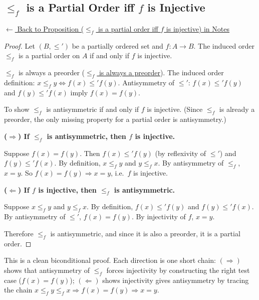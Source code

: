 
\subsection*{$\leq_f$ is a Partial Order iff $f$ is Injective}
\label{prf:induced-poset}

\begin{remark*}[Return]
\hyperref[prop:induced-poset]{$\leftarrow$ Back to Proposition ($\leq_f$ is a partial order iff $f$ is injective) in Notes}
\end{remark*}

\begin{proof}
\Claim Let $(B, \leq')$ be a partially ordered set and $f : A \to B$. The induced order $\leq_f$ is a partial order on $A$ if and only if $f$ is injective.

\Given $\leq_f$ is always a preorder
(\hyperref[prop:induced-preorder]{$\leq_f$ is always a preorder}). The
induced order definition: $x \leq_f y \Leftrightarrow f(x) \leq' f(y)$.
Antisymmetry of $\leq'$: $f(x) \leq' f(y)$ and $f(y) \leq' f(x)$ imply
$f(x) = f(y)$.

\Goal To show $\leq_f$ is antisymmetric if and only if $f$ is injective.
(Since $\leq_f$ is already a preorder, the only missing property for a partial
order is antisymmetry.)

\medskip
\noindent\textbf{($\Rightarrow$) If $\leq_f$ is antisymmetric, then $f$ is
injective.}

Suppose $f(x) = f(y)$. Then $f(x) \leq' f(y)$ (by reflexivity of $\leq'$)
and $f(y) \leq' f(x)$. By definition, $x \leq_f y$ and $y \leq_f x$. By
antisymmetry of $\leq_f$, $x = y$. So $f(x) = f(y) \Rightarrow x = y$, i.e.\
$f$ is injective.

\medskip
\noindent\textbf{($\Leftarrow$) If $f$ is injective, then $\leq_f$ is
antisymmetric.}

Suppose $x \leq_f y$ and $y \leq_f x$. By definition, $f(x) \leq' f(y)$ and
$f(y) \leq' f(x)$. By antisymmetry of $\leq'$, $f(x) = f(y)$. By injectivity
of $f$, $x = y$.

Therefore $\leq_f$ is antisymmetric, and since it is also a preorder, it is a
partial order. \AsReq
\end{proof}

\begin{remark*}
This is a clean biconditional proof. Each direction is one short chain:
$(\Rightarrow)$ shows that antisymmetry of $\leq_f$ forces injectivity by
constructing the right test case ($f(x) = f(y)$); $(\Leftarrow)$ shows
injectivity gives antisymmetry by tracing the chain $x \leq_f y \leq_f x
\Rightarrow f(x) = f(y) \Rightarrow x = y$.
\end{remark*}

